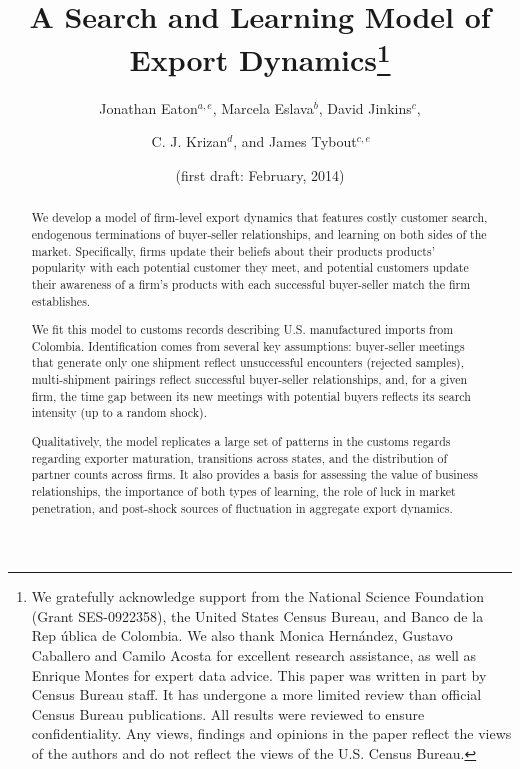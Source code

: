 \documentclass[12pt]{article}
\begin{document}
\title{A Search and Learning Model of Export Dynamics\thanks{%
We gratefully acknowledge support from the National Science Foundation
(Grant SES-0922358), the United States Census Bureau, and Banco de la Rep%
\'{u}blica de Colombia. We also thank Monica Hern\'{a}ndez, Gustavo
Caballero and Camilo Acosta for excellent research assistance, as well as
Enrique Montes for expert data advice. This paper was written in part by
Census Bureau staff. It has undergone a more limited review than official
Census Bureau publications. All results were reviewed to ensure
confidentiality. Any views, findings and opinions in the paper reflect the
views of the authors and do not reflect the views of the U.S. Census Bureau.}%
}
\author{Jonathan Eaton$^{a,e}$, Marcela Eslava$^{b}$, David Jinkins$^{c}$,
\and \ \ \ \ \ \ \ C. J. Krizan$^{d}$, and James Tybout$^{c,e}$ \ \ \ \ \ \ 
\and (first draft: February, 2014) }
\maketitle

\begin{abstract}
We develop a model of firm-level export dynamics that features costly
customer search, endogenous terminations of buyer-seller relationships, and
learning on both sides of the market. Specifically, firms update their
beliefs about their products products' popularity with each potential
customer they meet, and potential customers update their awareness of a
firm's products with each successful buyer-seller match the firm establishes.

We fit this model to customs records describing U.S. manufactured imports
from Colombia. Identification comes from several key assumptions:
buyer-seller meetings that generate only one shipment reflect unsuccessful
encounters (rejected samples), multi-shipment pairings reflect successful
buyer-seller relationships, and, for a given firm, the time gap between its
new meetings with potential buyers reflects its search intensity (up to a
random shock).

Qualitatively, the model replicates a large set of patterns in the customs
regards regarding exporter maturation, transitions across states, and the
distribution of partner counts across firms. It also provides a basis for
assessing the value of business relationships, the importance of both types
of learning, the role of luck in market penetration, and post-shock sources
of fluctuation in aggregate export dynamics.
\end{abstract}
\end{document}
